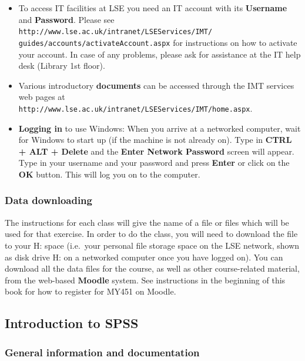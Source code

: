\documentclass[11pt,a4paper,openany]{book}
\begin{document}
\begin{itemize}
\item
  To access IT facilities at LSE you need an IT account with its
  \textbf{Username} and \textbf{Password}. Please see
  \texttt{http://www.lse.ac.uk/intranet/LSEServices/IMT/}\\
  \texttt{guides/accounts/activateAccount.aspx} for instructions on how
  to activate your account. In case of any problems, please ask for
  assistance at the IT help desk (Library 1st floor).
\item
  Various introductory \textbf{documents} can be accessed through the
  IMT services web pages at
  \texttt{http://www.lse.ac.uk/intranet/LSEServices/IMT/home.aspx}.
\item
  \textbf{Logging in} to use Windows: When you arrive at a networked
  computer, wait for Windows to start up (if the machine is not already
  on). Type in \textbf{CTRL + ALT + Delete} and the \textbf{Enter
  Network Password} screen will appear. Type in your username and your
  password and press \textbf{Enter} or click on the \textbf{OK} button.
  This will log you on to the computer.
\end{itemize}

\subsubsection*{Data downloading}\label{data-downloading}

The instructions for each class will give the name of a file or files
which will be used for that exercise. In order to do the class, you will
need to download the file to your H: space (i.e.~your personal file
storage space on the LSE network, shown as disk drive H: on a networked
computer once you have logged on). You can download all the data files
for the course, as well as other course-related material, from the
web-based \textbf{Moodle} system. See instructions in the beginning of
this book for how to register for MY451 on Moodle.

\subsection{Introduction to SPSS}\label{s-intro-SPSS}

\subsubsection*{General information and
documentation}\label{general-information-and-documentation}
\end{document}
